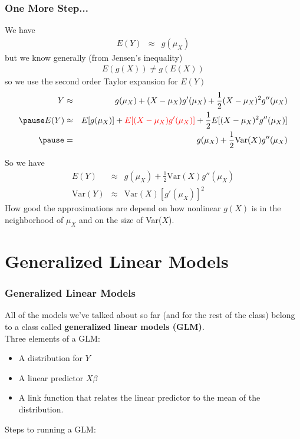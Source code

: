 \documentclass[handout]{beamer}
\begin{document}
\begin{frame}
\frametitle{One More Step...}
\pause
We have 
\begin{eqnarray*}
E(Y) &\approx& g(\mu_X)
\end{eqnarray*}
\pause
but we know generally (from Jensen's inequality)
\begin{eqnarray*}
E(g(X)) \neq g(E(X))
\end{eqnarray*} 
\pause
so we use the second order Taylor expansion for $E(Y)$
\pause
\begin{eqnarray*}
Y &\approx& g(\mu_X) + (X - \mu_X) g'(\mu_X) + \frac{1}{2} (X-\mu_X)^2
g''(\mu_X) \\ 
\pause
E(Y) &\approx& E[g(\mu_X)] + \red{E[(X - \mu_X) g'(\mu_X)]} + \frac{1}{2}
E[(X-\mu_X)^2 g''(\mu_X)] \\
\pause
&=& g(\mu_X) + \frac{1}{2} \mathrm{Var}(X) g''(\mu_X)
\end{eqnarray*}
\end{frame}

\begin{frame}
So we have
\begin{eqnarray*}
E(Y) &\approx& g(\mu_X) + \frac{1}{2} \mathrm{Var}(X) g''(\mu_X) \\
\mathrm{Var}(Y) &\approx& \mathrm{Var}(X) [g'(\mu_X)]^2
\end{eqnarray*}
\pause
How good the approximations are depend on how nonlinear $g(X)$ is in
the neighborhood of $\mu_X$ and on the size of Var($X$).
\end{frame}

\section{Generalized Linear Models}

\begin{frame}
\frametitle{Generalized Linear Models}
\pause
All of the models we've talked about so far (and for the rest of the
class) belong to a class called \textbf{generalized linear models (GLM)}.\\
\pause
\bigskip
Three elements of a GLM:
\pause
\begin{itemize}
\item A distribution for $Y$
\pause
\item A linear predictor $X\beta$
\pause
\item A link function that relates the linear predictor to the mean of
the distribution.
\end{itemize}
\pause
\bigskip
Steps to running a GLM:
\end{frame}
\end{document}
